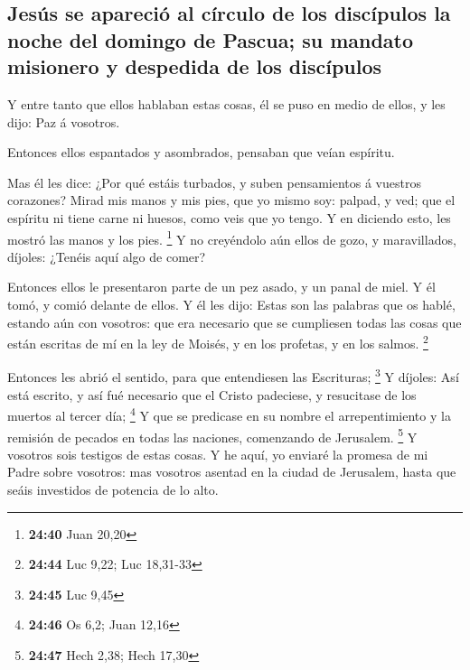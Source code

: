 \hypertarget{jesuxfas-se-apareciuxf3-al-cuxedrculo-de-los-discuxedpulos-la-noche-del-domingo-de-pascua-su-mandato-misionero-y-despedida-de-los-discuxedpulos}{%
\subsection{Jesús se apareció al círculo de los discípulos la noche del
domingo de Pascua; su mandato misionero y despedida de los
discípulos}\label{jesuxfas-se-apareciuxf3-al-cuxedrculo-de-los-discuxedpulos-la-noche-del-domingo-de-pascua-su-mandato-misionero-y-despedida-de-los-discuxedpulos}}

 Y entre tanto que ellos hablaban estas cosas, él se puso
en medio de ellos, y les dijo: Paz á vosotros.

 Entonces ellos espantados y asombrados, pensaban que
veían espíritu.

 Mas él les dice: ¿Por qué estáis turbados, y suben
pensamientos á vuestros corazones?  Mirad mis manos y mis
pies, que yo mismo soy: palpad, y ved; que el espíritu ni tiene carne ni
huesos, como veis que yo tengo.  Y en diciendo esto, les
mostró las manos y los pies. \footnote{\textbf{24:40} Juan 20,20}
 Y no creyéndolo aún ellos de gozo, y maravillados,
díjoles: ¿Tenéis aquí algo de comer?

 Entonces ellos le presentaron parte de un pez asado, y
un panal de miel.  Y él tomó, y comió delante de ellos.
 Y él les dijo: Estas son las palabras que os hablé,
estando aún con vosotros: que era necesario que se cumpliesen todas las
cosas que están escritas de mí en la ley de Moisés, y en los profetas, y
en los salmos. \footnote{\textbf{24:44} Luc 9,22; Luc 18,31-33}

 Entonces les abrió el sentido, para que entendiesen las
Escrituras; \footnote{\textbf{24:45} Luc 9,45}  Y
díjoles: Así está escrito, y así fué necesario que el Cristo padeciese,
y resucitase de los muertos al tercer día; \footnote{\textbf{24:46} Os
  6,2; Juan 12,16}  Y que se predicase en su nombre el
arrepentimiento y la remisión de pecados en todas las naciones,
comenzando de Jerusalem. \footnote{\textbf{24:47} Hech 2,38; Hech 17,30}
 Y vosotros sois testigos de estas cosas. 
Y he aquí, yo enviaré la promesa de mi Padre sobre vosotros: mas
vosotros asentad en la ciudad de Jerusalem, hasta que seáis investidos
de potencia de lo alto.

